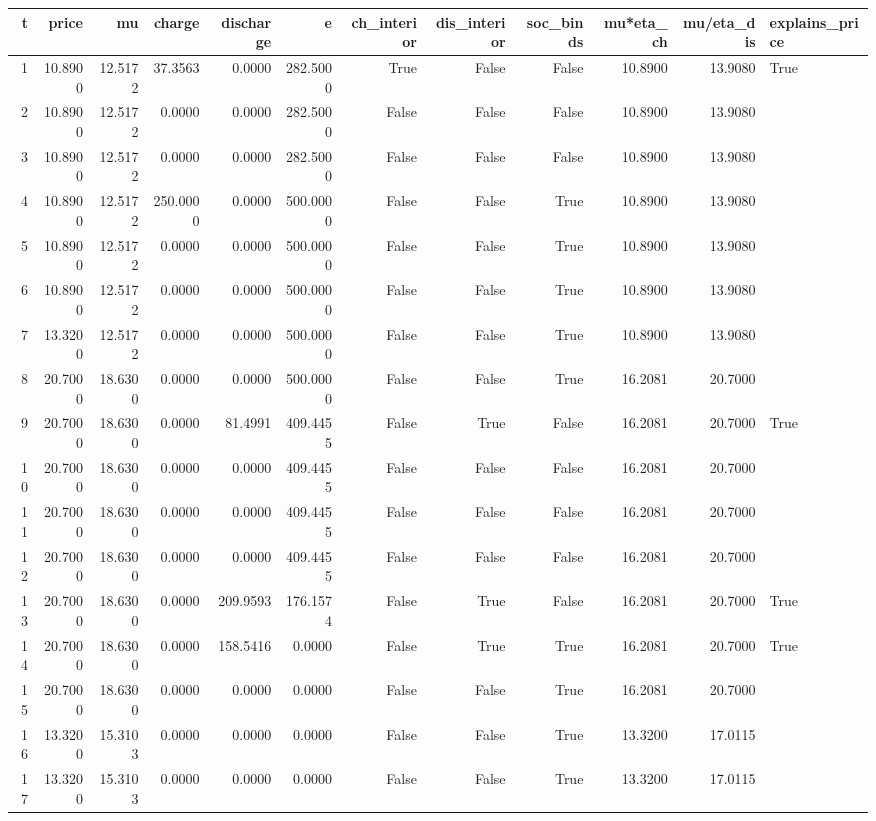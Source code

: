 \begin{tabular}{rrrrrrrrrrrl}
\toprule
t & price & mu & charge & discharge & e & ch\_interior & dis\_interior & soc\_binds & mu*eta\_ch & mu/eta\_dis & explains\_price \\
\midrule
1 & 10.8900 & 12.5172 & 37.3563 & 0.0000 & 282.5000 & True & False & False & 10.8900 & 13.9080 & True \\
2 & 10.8900 & 12.5172 & 0.0000 & 0.0000 & 282.5000 & False & False & False & 10.8900 & 13.9080 &  \\
3 & 10.8900 & 12.5172 & 0.0000 & 0.0000 & 282.5000 & False & False & False & 10.8900 & 13.9080 &  \\
4 & 10.8900 & 12.5172 & 250.0000 & 0.0000 & 500.0000 & False & False & True & 10.8900 & 13.9080 &  \\
5 & 10.8900 & 12.5172 & 0.0000 & 0.0000 & 500.0000 & False & False & True & 10.8900 & 13.9080 &  \\
6 & 10.8900 & 12.5172 & 0.0000 & 0.0000 & 500.0000 & False & False & True & 10.8900 & 13.9080 &  \\
7 & 13.3200 & 12.5172 & 0.0000 & 0.0000 & 500.0000 & False & False & True & 10.8900 & 13.9080 &  \\
8 & 20.7000 & 18.6300 & 0.0000 & 0.0000 & 500.0000 & False & False & True & 16.2081 & 20.7000 &  \\
9 & 20.7000 & 18.6300 & 0.0000 & 81.4991 & 409.4455 & False & True & False & 16.2081 & 20.7000 & True \\
10 & 20.7000 & 18.6300 & 0.0000 & 0.0000 & 409.4455 & False & False & False & 16.2081 & 20.7000 &  \\
11 & 20.7000 & 18.6300 & 0.0000 & 0.0000 & 409.4455 & False & False & False & 16.2081 & 20.7000 &  \\
12 & 20.7000 & 18.6300 & 0.0000 & 0.0000 & 409.4455 & False & False & False & 16.2081 & 20.7000 &  \\
13 & 20.7000 & 18.6300 & 0.0000 & 209.9593 & 176.1574 & False & True & False & 16.2081 & 20.7000 & True \\
14 & 20.7000 & 18.6300 & 0.0000 & 158.5416 & 0.0000 & False & True & True & 16.2081 & 20.7000 & True \\
15 & 20.7000 & 18.6300 & 0.0000 & 0.0000 & 0.0000 & False & False & True & 16.2081 & 20.7000 &  \\
16 & 13.3200 & 15.3103 & 0.0000 & 0.0000 & 0.0000 & False & False & True & 13.3200 & 17.0115 &  \\
17 & 13.3200 & 15.3103 & 0.0000 & 0.0000 & 0.0000 & False & False & True & 13.3200 & 17.0115 &  \\

\end{tabular}

